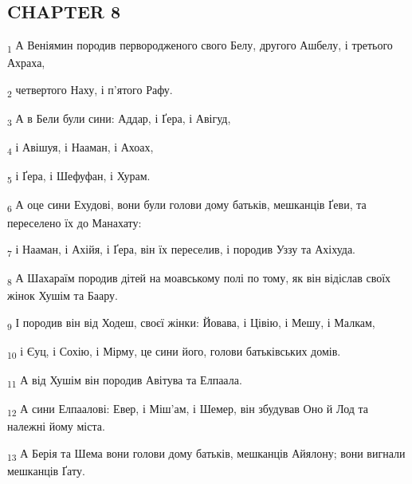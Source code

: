 \subsection{CHAPTER 8}
\begin{tcolorbox}
\textsubscript{1} А Веніямин породив первородженого свого Белу, другого Ашбелу, і третього Ахраха,
\end{tcolorbox}
\begin{tcolorbox}
\textsubscript{2} четвертого Наху, і п'ятого Рафу.
\end{tcolorbox}
\begin{tcolorbox}
\textsubscript{3} А в Бели були сини: Аддар, і Ґера, і Авігуд,
\end{tcolorbox}
\begin{tcolorbox}
\textsubscript{4} і Авішуя, і Нааман, і Ахоах,
\end{tcolorbox}
\begin{tcolorbox}
\textsubscript{5} і Ґера, і Шефуфан, і Хурам.
\end{tcolorbox}
\begin{tcolorbox}
\textsubscript{6} А оце сини Ехудові, вони були голови дому батьків, мешканців Ґеви, та переселено їх до Манахату:
\end{tcolorbox}
\begin{tcolorbox}
\textsubscript{7} і Нааман, і Ахійя, і Ґера, він їх переселив, і породив Уззу та Ахіхуда.
\end{tcolorbox}
\begin{tcolorbox}
\textsubscript{8} А Шахараїм породив дітей на моавському полі по тому, як він відіслав своїх жінок Хушім та Баару.
\end{tcolorbox}
\begin{tcolorbox}
\textsubscript{9} І породив він від Ходеш, своєї жінки: Йовава, і Цівію, і Мешу, і Малкам,
\end{tcolorbox}
\begin{tcolorbox}
\textsubscript{10} і Єуц, і Сохію, і Мірму, це сини його, голови батьківських домів.
\end{tcolorbox}
\begin{tcolorbox}
\textsubscript{11} А від Хушім він породив Авітува та Елпаала.
\end{tcolorbox}
\begin{tcolorbox}
\textsubscript{12} А сини Елпаалові: Евер, і Міш'ам, і Шемер, він збудував Оно й Лод та належні йому міста.
\end{tcolorbox}
\begin{tcolorbox}
\textsubscript{13} А Берія та Шема вони голови дому батьків, мешканців Айялону; вони вигнали мешканців Ґату.
\end{tcolorbox}
